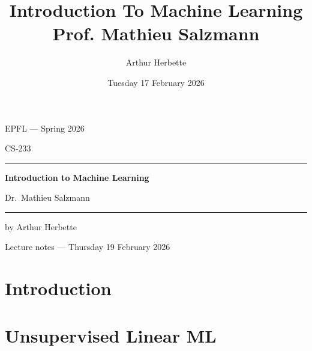 \documentclass[a4paper]{book}
\title{Introduction To Machine Learning \\ Prof. Mathieu Salzmann}
\author{Arthur Herbette}
\date{Tuesday 17 February 2026}
\begin{document}
\begin{titlepage}
    \centering
    \vspace*{2cm}
    
    {\large EPFL --- Spring 2026\par}
    \vspace{0.5cm}
    {\small CS-233\par}
    
    \vspace{2cm}
    \rule{\linewidth}{0.4pt}
    \vspace{0.4cm}
    
    {\huge\bfseries Introduction to Machine Learning\par}
    \vspace{0.3cm}
    {\large Dr.\ Mathieu Salzmann\par}
    
    \vspace{0.4cm}
    \rule{\linewidth}{0.4pt}
    
    \vfill
    
    {by Arthur Herbette\par}
    \vspace{0.3cm}
    {\small Lecture notes --- Thursday 19 February 2026\par}
    
    \vspace{2cm}
\end{titlepage}


\tableofcontents
\newpage

\chapter{Introduction}











\chapter{Unsupervised Linear ML}



\end{document}
